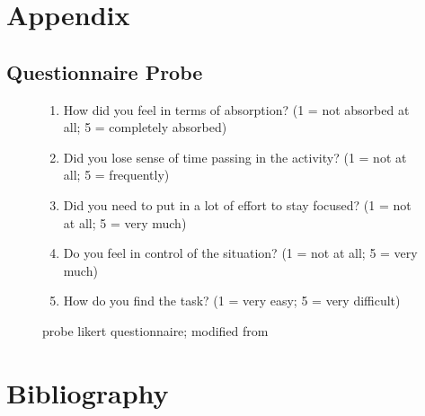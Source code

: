 \documentclass{article}
\begin{document}
\pagebreak

\section{Appendix}


\subsection{Questionnaire Probe}
    
\begin{figure}[H]
    \center
    \begin{enumerate}
        \item How did you feel in terms of absorption? (1 = not absorbed at all; 5 = completely absorbed)
        \item Did you lose sense of time passing in the activity? (1 = not at all; 5 = frequently)
        \item Did you need to put in a lot of effort to stay focused? (1 = not at all; 5 = very much)
        \item Do you feel in control of the situation? (1 = not at all; 5 = very much)
        \item How do you find the task? (1 = very easy; 5 = very difficult)
    \end{enumerate}
    \caption{probe likert questionnaire; modified from \parencite{AINLEY2008109}}
    \label{fig:probe qestions}
\end{figure}

\section{Bibliography}
    

\printbibliography
\end{document}

